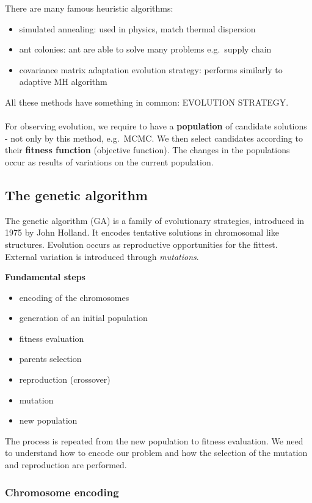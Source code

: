 There are many famous heuristic algorithms:

\begin{itemize}
\tightlist
\item
  simulated annealing: used in physics, match thermal dispersion
\item
  ant colonies: ant are able to solve many problems e.g.~supply chain
\item
  covariance matrix adaptation evolution strategy: performs similarly to
  adaptive MH algorithm
\end{itemize}
\noindent
All these methods have something in common: EVOLUTION STRATEGY.
\\
\\
\noindent
For observing evolution, we require to have a \textbf{population} of
candidate solutions - not only by this method, e.g.~MCMC. We then select
candidates according to their \textbf{fitness function} (objective
function). The changes in the populations occur as results of variations
on the current population.


\subsection{The genetic algorithm}

The genetic algorithm (GA) is a family of evolutionary strategies,
introduced in 1975 by John Holland. It encodes tentative solutions in
chromosomal like structures. Evolution occurs as reproductive
opportunities for the fittest. External variation is introduced through
\emph{mutations}.

\textbf{Fundamental steps}

\begin{itemize}
\tightlist
\item
  encoding of the chromosomes
\item
  generation of an initial population
\item
  fitness evaluation
\item
  parents selection
\item
  reproduction (crossover)
\item
  mutation
\item
  new population
\end{itemize}
\noindent
The process is repeated from the new population to fitness evaluation.
We need to understand how to encode our problem and how the selection of
the mutation and reproduction are performed.


\subsubsection{Chromosome encoding}

